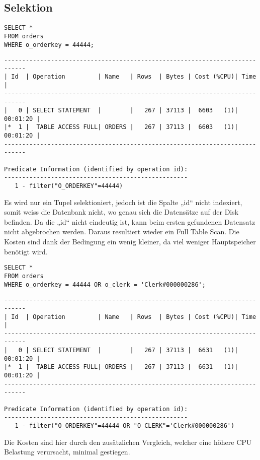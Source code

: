 \documentclass[10pt]{article}
\begin{document}
\subsection{Selektion}
\begin{lstlisting}[style=sql]
SELECT *
FROM orders
WHERE o_orderkey = 44444;
\end{lstlisting}
\begin{lstlisting}[style=queryexecutionplan]
----------------------------------------------------------------------------
| Id  | Operation         | Name   | Rows  | Bytes | Cost (%CPU)| Time     |
----------------------------------------------------------------------------
|   0 | SELECT STATEMENT  |        |   267 | 37113 |  6603   (1)| 00:01:20 |
|*  1 |  TABLE ACCESS FULL| ORDERS |   267 | 37113 |  6603   (1)| 00:01:20 |
----------------------------------------------------------------------------

Predicate Information (identified by operation id):
---------------------------------------------------
   1 - filter("O_ORDERKEY"=44444)
\end{lstlisting}
Es wird nur ein Tupel selektioniert, jedoch ist die Spalte „id“ nicht indexiert, 
somit weiss die Datenbank nicht, wo genau sich die Datensätze auf der Disk 
befinden. Da die „id“ nicht eindeutig ist, kann beim ersten gefundenen Datensatz 
nicht abgebrochen werden. Daraus resultiert wieder ein Full Table Scan. Die 
Kosten sind dank der Bedingung ein wenig kleiner, da viel weniger Hauptspeicher 
benötigt wird.

\begin{lstlisting}[style=sql]
SELECT *
FROM orders
WHERE o_orderkey = 44444 OR o_clerk = 'Clerk#000000286';
\end{lstlisting}
\begin{lstlisting}[style=queryexecutionplan]
----------------------------------------------------------------------------
| Id  | Operation         | Name   | Rows  | Bytes | Cost (%CPU)| Time     |
----------------------------------------------------------------------------
|   0 | SELECT STATEMENT  |        |   267 | 37113 |  6631   (1)| 00:01:20 |
|*  1 |  TABLE ACCESS FULL| ORDERS |   267 | 37113 |  6631   (1)| 00:01:20 |
----------------------------------------------------------------------------

Predicate Information (identified by operation id):
---------------------------------------------------
   1 - filter("O_ORDERKEY"=44444 OR "O_CLERK"='Clerk#000000286')
\end{lstlisting}
Die Kosten sind hier durch den zusätzlichen Vergleich, welcher eine höhere 
CPU Belastung verursacht, minimal gestiegen.
\end{document}
